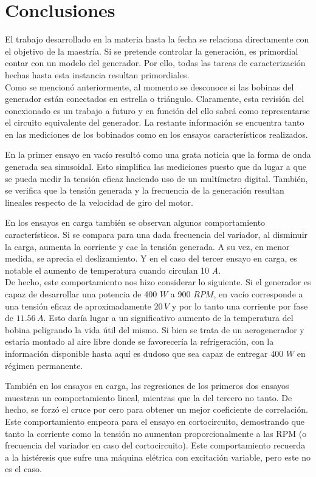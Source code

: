 \documentclass[a4paper,11pt,twoside]{IT-CNEA}
\begin{document}
\section{Conclusiones}
El trabajo desarrollado en la materia hasta la fecha se relaciona directamente con el objetivo de la maestría. Si se pretende controlar la generación, es primordial contar con un modelo del generador. Por ello, todas las tareas de caracterización hechas hasta esta instancia resultan primordiales.
\\Como se mencionó anteriormente, al momento se desconoce si las bobinas del generador están conectados en estrella o triángulo. Claramente, esta revisión del conexionado es un trabajo a futuro y en función del ello sabrá como representarse el circuito equivalente del generador. La restante información se encuentra tanto en las mediciones de los bobinados como en los ensayos característicos realizados. 
\par En la primer ensayo en vacío resultó como una grata noticia que la forma de onda generada sea sinusoidal. Esto simplifica las mediciones puesto que da lugar a que se pueda medir la tensión eficaz haciendo uso de un multímetro digital. También, se verifica que la tensión generada y la frecuencia de la generación resultan lineales respecto de la velocidad de giro del motor. 
\par En los ensayos en carga también se observan algunos comportamiento característicos. Si se compara para una dada frecuencia del variador, al disminuir la carga, aumenta la corriente y cae la tensión generada. A su vez, en menor medida, se aprecia el deslizamiento. Y en el caso del tercer ensayo en carga, es notable el aumento de temperatura cuando circulan 10 \textit{A}.
\\ De hecho, este comportamiento nos hizo considerar lo siguiente. Si el generador es capaz de desarrollar una potencia de 400 $W$ a 900 $RPM$, en vacío corresponde a una tensión eficaz de aproximadamente $20\,V$ y por lo tanto una corriente por fase de $11.56\,A$. Esto daría lugar a un significativo aumento de la temperatura del bobina peligrando la vida útil del mismo. Si bien se trata de un aerogenerador y estaría montado al aire libre donde se favorecería la refrigeración, con la información disponible hasta aquí es dudoso que sea capaz de entregar 400 $W$ en régimen permanente. 
\par También en los ensayos en carga, las regresiones de los primeros dos ensayos muestran un comportamiento lineal, mientras que la del tercero no tanto. De hecho, se forzó el cruce por cero para obtener un mejor coeficiente de correlación. Este comportamiento empeora para el ensayo en cortocircuito, demostrando que tanto la corriente como la tensión no aumentan proporcionalmente a las RPM (o frecuencia del variador en caso del cortocircuito). Este comportamiento recuerda a la histéresis que sufre una máquina elétrica con excitación variable, pero este no es el caso. 
\end{document}
